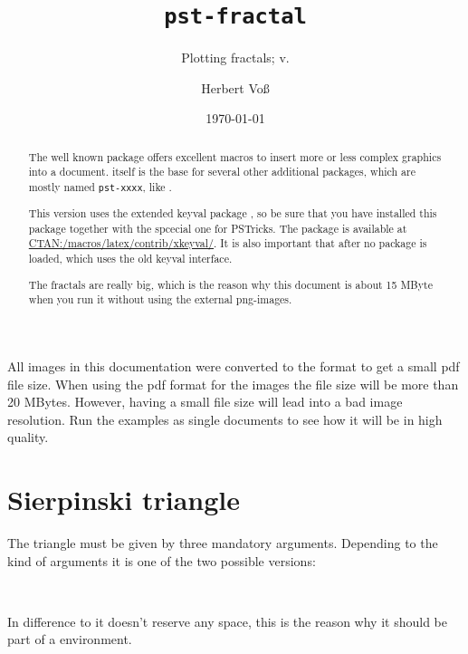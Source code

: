 \documentclass[11pt,english,BCOR10mm,DIV12,bibliography=totoc,parskip=false,
   smallheadings, headexclude,footexclude,oneside]{pst-doc}
\let\pstFV\fileversion
\def\PSLenv{\Lenv{pspicture}}
\begin{document}
\title{\texttt{pst-fractal}}
\subtitle{Plotting fractals; v.\pstFV}
\author{Herbert Vo\ss}
\docauthor{}
\date{\today}
\maketitle

\tableofcontents

\clearpage

\begin{abstract}
\noindent
The well known  package offers excellent macros to insert more or less complex 
graphics into a document.  itself is the base for several other additional packages, 
which are mostly named \verb+pst-xxxx+, like .

This version uses the extended keyval package , so be sure that you have installed
this package together with the spcecial one  for PSTricks. The 
package is available at \url{CTAN:/macros/latex/contrib/xkeyval/}.
It is also important that after  no package is loaded, which uses the old keyval interface.

The fractals are really big, which is the reason why this document is about 15 MByte
when you run it without using the external png-images.
\end{abstract}%

All images in this documentation were converted to the  format to get
a small pdf file size. When using the pdf format for the images the file size will be
more than 20 MBytes. However, having a small file size will lead into a bad image
resolution. Run the examples as single documents to see how it will be in
high quality.


\section{Sierpinski triangle}

The triangle must be given by three mandatory arguments. Depending to the kind of
arguments it is one of the two possible versions:

\begin{BDef}
\OptArgs{}\\
\OptArgs{}
\end{BDef}

In difference to  it doesn't reserve any space, this is the
reason why it should be part of a \PSLenv{} environment.
\end{document}
